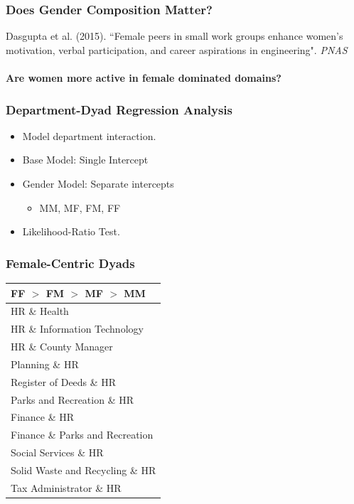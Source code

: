 \documentclass[xcolor={table}, fleqn]{beamer}
\newcommand{\male}[1]{\colorbox{male}{#1}}
\newcommand{\female}[1]{\colorbox{female}{#1}}
\begin{document}
\begin{frame}\frametitle{Does Gender Composition Matter?}
	\LARGE
Dasgupta et al. (2015). ``Female peers in small work groups enhance women’s motivation, verbal participation, and career aspirations in engineering". \emph{PNAS} \\~\\
\textbf{Are women more active in female dominated domains?}
\end{frame}

\begin{frame}\frametitle{Department-Dyad Regression Analysis}
	\LARGE
	\begin{itemize}
		\item Model department interaction.
		\vspace*{.3in}
		\item Base Model: Single Intercept
		\vspace*{.3in}
		\item Gender Model: Separate intercepts
		\vspace*{.15in}
		\begin{itemize}
			\LARGE
			\item MM, MF, FM, FF
		\end{itemize}
		\vspace*{.15in}
		\item Likelihood-Ratio Test.
	\end{itemize}
\end{frame}


\begin{frame}\frametitle{Female-Centric Dyads}
	\centering
	\Large
	\begin{tabular}{l}
	  \toprule
	FF $>$ FM $>$ MF $>$ MM  \\
	\hline
	  \female{HR} \& Health  \\ 
	  \female{HR} \& \male{Information Technology}  \\ 
	  \female{HR} \& \male{County Manager}  \\ 
	  \male{Planning} \& \female{HR} \\ 
	  Register of Deeds \& \female{HR}  \\ 
	  Parks and Recreation \& \female{HR}  \\ 
	  \female{Finance} \& \female{HR}  \\ 
	  \female{Finance} \& Parks and Recreation  \\ 
	  Social Services \& \female{HR}  \\ 
	  \male{Solid Waste and Recycling} \& \female{HR}  \\ 
	  Tax Administrator \& \female{HR}  \\ 
	   \bottomrule
	\end{tabular}
	
	
	
	
\end{frame}
\end{document}
